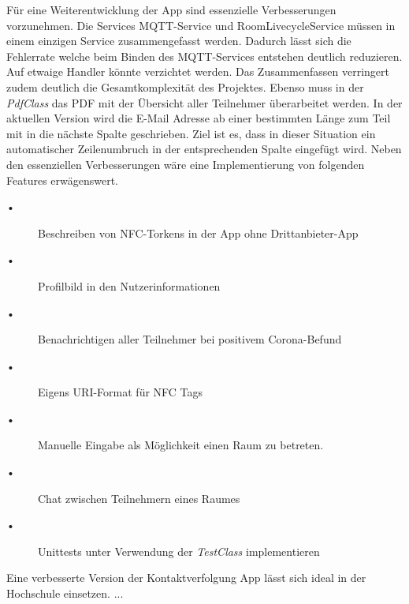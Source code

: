 Für eine Weiterentwicklung der App sind essenzielle Verbesserungen vorzunehmen. Die Services MQTT-Service und RoomLivecycleService müssen in einem einzigen Service zusammengefasst werden. 
Dadurch lässt sich die Fehlerrate welche beim Binden des MQTT-Services entstehen deutlich reduzieren. Auf etwaige Handler könnte verzichtet werden. 
Das Zusammenfassen verringert zudem deutlich die Gesamtkomplexität des Projektes.
 Ebenso muss in der \textit{PdfClass} das PDF mit der Übersicht aller Teilnehmer überarbeitet werden. 
 In der aktuellen Version wird die E-Mail Adresse ab einer bestimmten Länge zum Teil mit in die nächste Spalte geschrieben.
 Ziel ist es, dass in dieser Situation ein automatischer Zeilenumbruch in der entsprechenden Spalte eingefügt wird.
Neben den essenziellen Verbesserungen  wäre eine Implementierung von folgenden Features erwägenswert.
\begin{description}
\item[•]Beschreiben von NFC-Torkens in der App ohne Drittanbieter-App 
\item[•]Profilbild in den Nutzerinformationen
\item[•]Benachrichtigen aller Teilnehmer bei positivem Corona-Befund
\item[•]Eigens URI-Format für NFC Tags
\item[•]Manuelle Eingabe als Möglichkeit einen Raum zu betreten.
\item[•]Chat zwischen Teilnehmern eines Raumes
\item[•]Unittests unter Verwendung der \textit{TestClass} implementieren
\end{description}


Eine verbesserte Version der Kontaktverfolgung App lässt sich ideal in der Hochschule einsetzen. ...